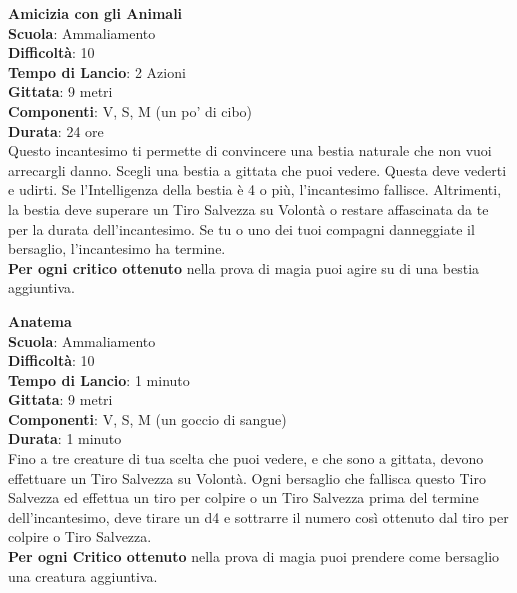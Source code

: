 \begin{multicols}{2}
\medskip\textbf{Amicizia con gli Animali}\\
\textbf{Scuola}: Ammaliamento\\
\textbf{Difficoltà}: 10\\
\textbf{Tempo di Lancio}: 2 Azioni\\
\textbf{Gittata}: 9 metri\\
\textbf{Componenti}: V, S, M (un po' di cibo)\\
\textbf{Durata}: 24 ore\\
Questo incantesimo ti permette di convincere una bestia naturale che non vuoi arrecargli danno. Scegli una bestia a gittata che puoi vedere. Questa deve vederti e udirti. Se l'Intelligenza della bestia è 4 o più, l'incantesimo fallisce. Altrimenti, la bestia deve superare un Tiro Salvezza su Volontà o restare affascinata da te per la durata dell'incantesimo. Se tu o uno dei tuoi compagni danneggiate il bersaglio, l'incantesimo ha termine.\\
\textbf{Per ogni critico ottenuto} nella prova di magia puoi agire su di una bestia aggiuntiva. 

\medskip\textbf{Anatema}\\
\textbf{Scuola}: Ammaliamento\\
\textbf{Difficoltà}: 10\\
\textbf{Tempo di Lancio}: 1 minuto\\
\textbf{Gittata}: 9 metri\\
\textbf{Componenti}: V, S, M (un goccio di sangue)\\
\textbf{Durata}: 1 minuto\\
Fino a tre creature di tua scelta che puoi vedere, e che sono a gittata, devono effettuare un Tiro Salvezza su Volontà. Ogni bersaglio che fallisca questo Tiro Salvezza ed effettua un tiro per colpire o un Tiro Salvezza prima del termine dell'incantesimo, deve tirare un d4 e sottrarre il numero così ottenuto dal tiro per colpire o Tiro Salvezza.\\
\textbf{Per ogni Critico ottenuto} nella prova di magia puoi prendere come bersaglio una creatura aggiuntiva.


\end{multicols}
